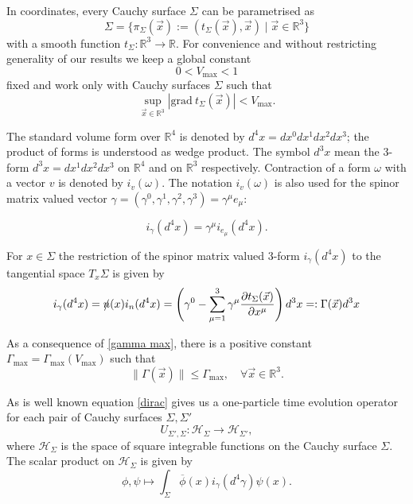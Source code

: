 \documentclass[b5paper,draft,openbib,12pt]{memoir}
\begin{document}
  In coordinates, every Cauchy surface \(\Sigma\) can be parametrised as
\begin{equation}
\Sigma= \{ \pi_\Sigma(\vec{x}):=(t_\Sigma(\vec{x}),\vec{x})\mid \vec{x}\in\mathbb{R}^3\}
\end{equation}
with a smooth function \(t_\Sigma: \mathbb{R}^3\rightarrow \mathbb{R}\). For convenience and without restricting generality of our results we keep a global constant 
\begin{equation}
0<V_{\max}<1
\end{equation}
fixed and work only with Cauchy surfaces \(\Sigma\) such that 
\begin{equation}\label{gamma max}
\sup_{\vec{x}\in\mathbb{R}^3} |\mathrm{grad}~ t_\Sigma( \vec{x})|<V_{\max}.
\end{equation}

The standard volume form over \(\mathbb{R}^4\) is denoted by \(d^4x=dx^0dx^1dx^2dx^3\); the product of forms is understood as wedge product. The symbol \(d^3x\) 
mean the 3-form \(d^3x=dx^1dx^2dx^3\) on \(\mathbb{R}^4\) and on \(\mathbb{R}^3\) respectively. Contraction of a form \(\omega\) with a vector \(v\) is
denoted by \(i_v(\omega)\). The notation \(i_v(\omega)\) is also used for the spinor matrix valued 
vector \(\gamma= (\gamma^0,\gamma^1,\gamma^2,\gamma^3)=\gamma^\mu e_\mu\):

\begin{equation}
i_\gamma(d^4x)=\gamma^\mu i_{e_\mu}(d^4x).
\end{equation}

For \(x\in \Sigma\) the restriction of the spinor matrix valued 3-form \(i_\gamma(d^4x)\) to the tangential space \(T_x\Sigma\) is given by
\begin{equation}
i_\gamma(d^4x)=\slashed{n}(x)i_n(d^4x)= \left(\gamma^0-\sum_{\mu=1}^3 \gamma^\mu \frac{\partial t_\Sigma (\vec{x})}{\partial x^\mu}\right) d^3x=:\Gamma(\vec{x})d^3x
\end{equation}

As a consequence of \eqref{gamma max}, there is a positive constant \(\Gamma_{\max}=\Gamma_{\max}(V_{\max})\) such that
\begin{equation}
\|\Gamma(\vec{x})\| \le \Gamma_{\max}, \quad \forall \vec{x}\in\mathbb{R}^3.
\end{equation}


As is well known equation \eqref{dirac} gives us a 
one-particle time evolution operator for each pair of Cauchy surfaces \(\Sigma, \Sigma'\)
\begin{equation}
U_{\Sigma',\Sigma}:\mathcal{H}_\Sigma \rightarrow \mathcal{H}_{\Sigma'},
\end{equation}
where \(\mathcal{H}_\Sigma\) is the space of square integrable functions on the Cauchy surface \(\Sigma\). The scalar product on \(\mathcal{H}_\Sigma\)
is given by
\begin{equation}
\phi,\psi \mapsto \int_{\Sigma} \overline{\phi}(x) i_{\gamma}(d^4\gamma) \psi(x).
\end{equation}
\end{document}
